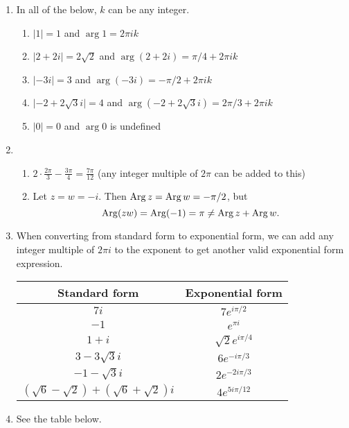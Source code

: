 \begin{enumerate}
\item In all of the below, $k$ can be any integer.
\begin{enumerate}
\item $\lvert 1\rvert = 1$ and $\arg 1 = 2\pi ik$
\item $\lvert 2 + 2i\rvert = 2\sqrt{2}$ and $\arg(2 + 2i) = \pi/4 + 2\pi ik$
\item $\lvert -3i\rvert = 3$ and $\arg(-3i) = -\pi/2 + 2\pi ik$
\item $\lvert -2 + 2\sqrt{3}i\rvert = 4$ and $\arg(-2 + 2\sqrt{3}i) = 2\pi/3 + 2\pi ik$
\item $\lvert 0\rvert = 0$ and $\arg 0$ is undefined
\end{enumerate}
\item \begin{enumerate}
\item $2\cdot\frac{2\pi}{3} - \frac{3\pi}{4} = \frac{7\pi}{12}$ (any integer multiple of $2\pi$ can be added to this)
\item Let $z = w = -i$. Then $\operatorname{Arg} z = \operatorname{Arg} w = -\pi/2$, but
\begin{equation*}
\operatorname{Arg}(zw) = \operatorname{Arg}(-1) = \pi\neq\operatorname{Arg} z + \operatorname{Arg} w.
\end{equation*}
\end{enumerate}
\item When converting from standard form to exponential form, we can add any integer multiple of $2\pi i$ to the exponent to get another valid exponential form expression.
\begin{center}
\begingroup
\setlength{\tabcolsep}{10pt}
\renewcommand{\arraystretch}{1.5}
\begin{tabular}{|c|c|} \hline
Standard form & Exponential form \\ \hline
$7i$ & $7e^{i\pi/2}$ \\ \hline
\color{red} $-1$ & $e^{\pi i}$ \\ \hline
$1 + i$ & \color{red} $\sqrt{2}e^{i\pi/4}$ \\ \hline
$3 - 3\sqrt{3}i$ & \color{red} $6e^{-i\pi/3}$ \\ \hline
\color{red} $-1 - \sqrt{3}i$ & $2e^{-2i\pi/3}$ \\ \hline
\color{red} $(\sqrt{6} - \sqrt{2}) + (\sqrt{6} + \sqrt{2})i$ & $4e^{5i\pi/12}$ \\ \hline
\end{tabular}
\endgroup
\end{center}
\item See the table below.

\end{enumerate}
